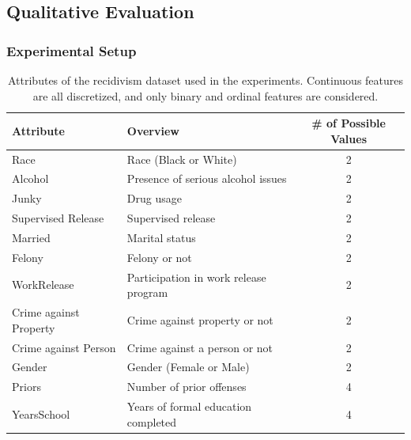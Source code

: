 \documentclass[runningheads]{llncs}
\begin{document}
\newpage
\subsection{Qualitative Evaluation}
\subsubsection{Experimental Setup}\label{sec:exp-setting}
{%
  \renewcommand{\arraystretch}{1.05}
  \begin{table}[tbp]
    \centering
    \caption[Attributes of the recidivism dataset used in the experiments]{%
      Attributes of the recidivism dataset used in the experiments.
      Continuous features are all discretized,
      and only binary and ordinal features are considered.
    }\label{tab:rcdv}
    \begin{tabular}{llc}
      \toprule
      Attribute              & Overview                              & \# of Possible Values \\
      \midrule
      Race                   & Race (Black or White)                 & 2                     \\
      Alcohol                & Presence of serious alcohol issues    & 2                     \\
      Junky                  & Drug usage                            & 2                     \\
      Supervised Release     & Supervised release                    & 2                     \\
      Married                & Marital status                        & 2                     \\
      Felony                 & Felony or not                         & 2                     \\
      WorkRelease            & Participation in work release program & 2                     \\
      Crime against Property & Crime against property or not         & 2                     \\
      Crime against Person   & Crime against a person or not         & 2                     \\
      Gender                 & Gender (Female or Male)               & 2                     \\
      Priors                 & Number of prior offenses              & 4                     \\
      YearsSchool            & Years of formal education completed   & 4                     \\

\end{tabular}
\end{table}}
\end{document}
